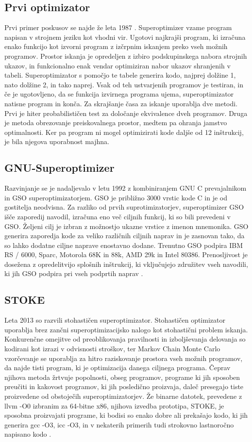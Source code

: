 \documentclass[a4paper, 12pt]{book}
\begin{document}
\subsection{Prvi optimizator} 
Prvi primer poskusov se najde že leta 1987 \cite{pd2}. Superoptimizer vzame program napisan v strojnem jeziku kot vhodni vir. Ugotovi  najkrajši program, ki izračuna enako funkcijo kot izvorni program z izčrpnim iskanjem preko vseh možnih programov. Prostor iskanja je opredeljen z izbiro podskupinskega nabora strojnih ukazov, in funkcionalno enak vendar optimiziran nabor ukazov shranjenih v tabeli. Superoptimizator s pomočjo te tabele generira kodo, najprej dolžine 1, nato dolžine 2, in tako naprej. Vsak od teh ustvarjenih programov je testiran, in če je ugotovljeno, da se funkcija izvirnega programa ujema, superoptimizator natisne program in konča. Za skrajšanje časa za iskanje uporablja dve metodi. Prvi je hiter probabilističen test za določanje ekvivalence dveh programov. Druga je metoda obrezovanje preiskovalnega prostor, medtem pa ohranja jamstvo optimalnosti. Ker pa program ni mogel optimizirati kode daljše od 12 inštrukcij, je bila njegova uporabnost majhna.
\subsection{GNU-Superoptimizer}
Razvinjanje se je nadaljevalo v letu 1992 z kombiniranjem GNU C prevajalnikom in GSO superoptimizatorjem. GSO je približno 3000 vrstic kode C in je od gostitelja neodvisna. Za razliko od prvih suprotimizatorjev, superoptimizer GSO išče zaporedij navodil, izračuna eno več ciljnih funkcij, ki so bili prevedeni v GSO. Željeni cilj je izbran z možnostjo ukazne vrstice z imenon mnemonika. GSO generira zaporedja kode za veliko različnih ciljnih naprav in je zasnovan tako, da so lahko dodatne ciljne naprave enostavno dodane. Trenutno GSO podpira IBM RS / 6000, Sparc, Motorola 68K in 88k, AMD 29k in Intel 80386. Prenosljivost je dosežena z opredelitvijo splošnih inštrukcij, ki vključujejo združitev vseh navodili, ki jih GSO podpira pri vseh podprtih naprav \cite{url1}.
\subsection{STOKE}
Leta 2013 so razvili stohastičen superoptimizator. Stohastičen optimizator uporablja brez zančni superoptimizacijsko nalogo kot stohastični problem iskanja. Konkurenčne omejitve od preoblikovanja pravilnosti in izboljševanja delovanja so kodirani kot izrazi v odvisnosti stroškov, ter Markov Chain Monte Carlo vzorčevanje se uporablja za hitro raziskovanje prostora vseh možnih programov, da najde tisti program, ki je optimizacija danega ciljnega programa. Čeprav njihova metoda žrtvuje popolnosti, obseg programov, programe ki jih sposoben preučiti in kakovost programov, ki jih posledično proizvaja, daleč presegajo tiste proizvedene od obstoječih superoptimizatorjev. Že binarne datotek, prevedene z  llvm -O0 izbranim za 64-bitne x86, njihova izvedba prototipa, STOKE, je sposobna proizvajati programe, ki bodisi so enako dobre ali prekašajo kodo, ki jih generira gcc -O3, icc -O3, in v nekaterih primerih tudi strokovno lastnoročno napisano kodo \cite{article1,article5}.
\end{document}
